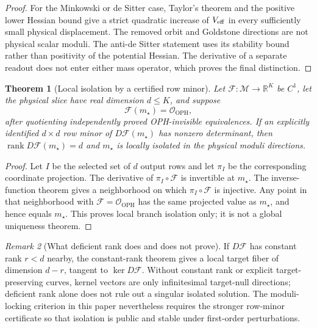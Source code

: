 \documentclass[11pt]{article}
\newtheorem{theorem}{Theorem}[section]
\theoremstyle{remark}
\newtheorem{remark}[theorem]{Remark}
\theoremstyle{plain}
\newcommand{\OPH}{\mathrm{OPH}}
\newcommand{\calF}{\mathcal F}
\newcommand{\calO}{\mathcal O}
\begin{document}
\begin{proof}
For the Minkowski or de Sitter case, Taylor's theorem and the positive lower Hessian bound give a
strict quadratic increase of \(V_{\rm eff}\) in every sufficiently small physical displacement.
The removed orbit and Goldstone directions are not physical scalar moduli. The anti-de Sitter
statement uses its stability bound rather than positivity of the potential Hessian. The derivative
of a separate readout does not enter either mass operator, which proves the final distinction.
\end{proof}

\begin{theorem}[Local isolation by a certified row minor]\label{thm:row-minor-isolation}
Let \(\calF:\mathcal M\to\mathbb R^K\) be \(C^1\), let the physical slice have real
dimension \(d\leq K\), and suppose
\[
\calF(m_\star)=\calO_{\OPH},
\]
after quotienting independently proved OPH-invisible equivalences. If an explicitly identified
\(d\times d\) row minor of \(D\calF(m_\star)\) has nonzero determinant, then
\(\operatorname{rank}D\calF(m_\star)=d\) and \(m_\star\) is locally isolated in the physical
moduli directions.
\end{theorem}

\begin{proof}
Let \(I\) be the selected set of \(d\) output rows and let \(\pi_I\) be the corresponding
coordinate projection. The derivative of \(\pi_I\circ\calF\) is invertible at \(m_\star\).
The inverse-function theorem gives a neighborhood on which \(\pi_I\circ\calF\) is injective.
Any point in that neighborhood with \(\calF=\calO_{\OPH}\) has the same projected value as
\(m_\star\), and hence equals \(m_\star\). This proves local branch isolation only; it is not a
global uniqueness theorem.
\end{proof}

\begin{remark}[What deficient rank does and does not prove]
If \(D\calF\) has constant rank \(r<d\) nearby, the constant-rank theorem gives a local target
fiber of dimension \(d-r\), tangent to \(\ker D\calF\). Without constant rank or explicit
target-preserving curves, kernel vectors are only infinitesimal target-null directions; deficient
rank alone does not rule out a singular isolated solution. The moduli-locking criterion in this paper
nevertheless requires the stronger row-minor certificate so that isolation is public and stable
under first-order perturbations.
\end{remark}
\end{document}
